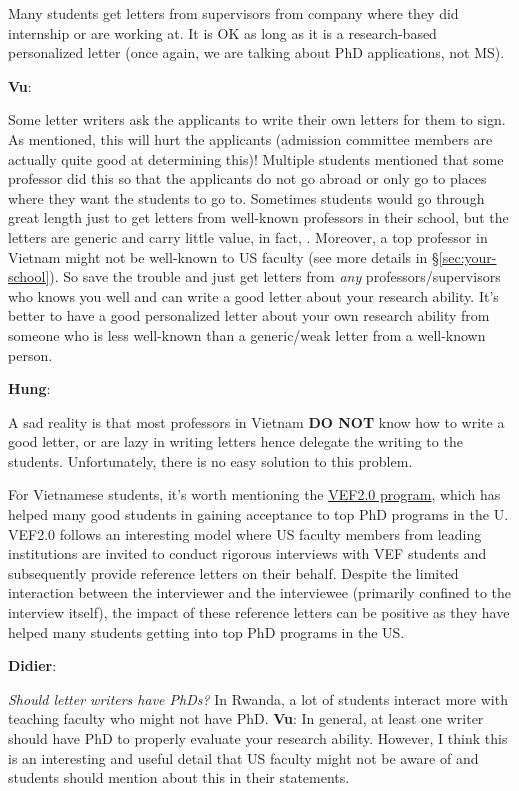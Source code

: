 \documentclass[11pt]{article}
\newenvironment{commentbox}[1][]{
\small
    \begin{cbox}
    \textbf{#1}: 
 }{
   \end{cbox}
}
\newcommand{\red}[1]{{\color{red}{#1}}}
\begin{document}
Many students get letters from supervisors from company where they did internship or are
working at. It is OK as long as it is a research-based personalized
letter (once again, we are talking about PhD applications, not MS).

\begin{commentbox}[Vu]
Some letter writers ask the applicants to write their own letters for them to sign. As mentioned, this will hurt the applicants (admission committee members are actually quite good at determining this)! Multiple students mentioned that  some professor did this so that the applicants do not go abroad or only go to places where they want the students to go to.
\tcblower
Sometimes students would go through great length just to get letters from well-known professors in their school, but the letters are generic and carry little value, in fact, \red{red flags}. Moreover, a top professor in Vietnam might not be well-known to US faculty (see more details in \S\ref{sec:your-school}). So save the trouble and just get letters from \emph{any} professors/supervisors who knows you well and can write a good letter about your research ability. It's better to have a good personalized
letter about your own research ability from someone who is less
well-known than a generic/weak letter from a well-known person.
\end{commentbox}

\begin{commentbox}[Hung]
A sad reality is that most professors in Vietnam \textbf{DO NOT} know how to write a good letter, or are lazy in writing letters hence delegate the writing to the students. Unfortunately, there is no easy solution to this problem.
\end{commentbox}

For Vietnamese students, it's worth mentioning the \href{https://vef2.org/}{VEF2.0 program}, which has helped many good students in gaining acceptance to top PhD programs in the U. VEF2.0 follows an interesting model where US faculty members from leading institutions are invited to conduct rigorous interviews with VEF students and subsequently provide reference letters on their behalf. Despite the limited interaction between the interviewer and the interviewee (primarily confined to the interview itself), the impact of these reference letters can be positive as they have helped many students getting into top PhD programs in the US.

\begin{commentbox}[Didier]
\emph{Should letter writers have PhDs?}  In Rwanda, a lot of students interact more with teaching faculty who might not have PhD.
\tcblower
\textbf{Vu}: In general, at least one writer should have PhD to properly evaluate your research ability.  However, I think this is an interesting and useful detail that US faculty might not be aware of and students should mention about this in their statements.
\end{commentbox}
\end{document}
